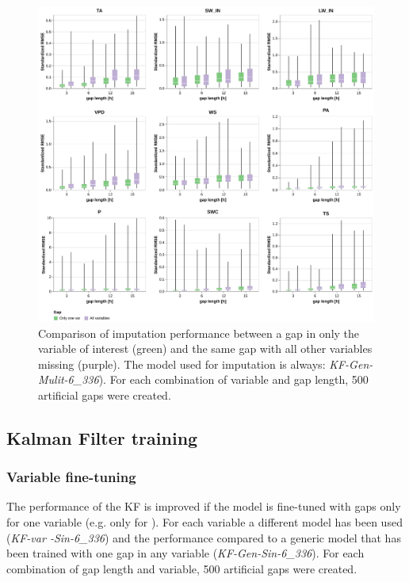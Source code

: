 \documentclass{article}
\newcommand{\imgwidth}{6in}
\let\Oldsubsection\subsection
\renewcommand{\subsection}{\FloatBarrier\Oldsubsection}
\begin{document}
\begin{figure}
\centerline{\includegraphics[width=\imgwidth]{images2/gap_single_var}}
\caption{Comparison of imputation performance between a gap in only the variable of interest (green) and the same gap with all other variables missing (purple). The model used for imputation is always: \textit{KF-Gen-Mulit-6\_336}). For each combination of variable and gap length, 500 artificial gaps were created.}
\label{fig:gap_single_var}
\end{figure}

\subsection{Kalman Filter training}

\subsubsection{Variable fine-tuning}

The performance of the KF is improved if the model is fine-tuned with gaps only for one variable (e.g. only for ). For each variable a different model has been used (\textit{KF-\textlangle var \textrangle-Sin-6\_336}) and the performance compared to a generic model that has been trained with one gap in any variable (\textit{KF-Gen-Sin-6\_336}). For each combination of gap length and variable, 500 artificial gaps were created.
\end{document}
